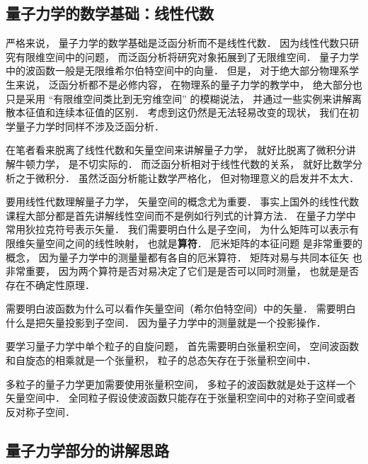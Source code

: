 
\begin{issues}
\issueDraft
\end{issues}

\subsection{量子力学的数学基础：线性代数}
严格来说， 量子力学的数学基础是泛函分析而不是线性代数． 因为线性代数只研究有限维空间中的问题， 而泛函分析将研究对象拓展到了无限维空间． 量子力学中的波函数一般是无限维希尔伯特空间中的向量． 但是， 对于绝大部分物理系学生来说， 泛函分析都不是必修内容， 在物理系的量子力学的教学中， 绝大部分也只是采用 “有限维空间类比到无穷维空间” 的模糊说法， 并通过一些实例来讲解离散本征值和连续本征值的区别． 考虑到这仍然是无法轻易改变的现状， 我们在初学量子力学时同样不涉及泛函分析．

在笔者看来脱离了线性代数和矢量空间来讲解量子力学， 就好比脱离了微积分讲解牛顿力学， 是不切实际的． 而泛函分析相对于线性代数的关系， 就好比数学分析之于微积分． 虽然泛函分析能让数学严格化， 但对物理意义的启发并不太大．

要用线性代数理解量子力学， 矢量空间的概念尤为重要． 事实上国外的线性代数课程大部分都是首先讲解线性空间而不是例如行列式的计算方法． 在量子力学中常用狄拉克符号表示矢量． 我们需要明白什么是子空间， 为什么矩阵可以表示有限维矢量空间之间的线性映射， 也就是\textbf{算符}． 厄米矩阵的本征问题 是非常重要的概念， 因为量子力学中的测量量都有各自的厄米算符． 矩阵对易与共同本征矢 也非常重要， 因为两个算符是否对易决定了它们是是否可以同时测量， 也就是是否存在不确定性原理．

需要明白波函数为什么可以看作矢量空间（希尔伯特空间）中的矢量． 需要明白什么是把矢量投影到子空间． 因为量子力学中的测量就是一个投影操作．

要学习量子力学中单个粒子的自旋问题， 首先需要明白张量积空间， 空间波函数和自旋态的相乘就是一个张量积， 粒子的总态矢存在于张量积空间中．

多粒子的量子力学更加需要使用张量积空间， 多粒子的波函数就是处于这样一个矢量空间中． 全同粒子假设使波函数只能存在于张量积空间中的对称子空间或者反对称子空间．

\subsection{量子力学部分的讲解思路}

